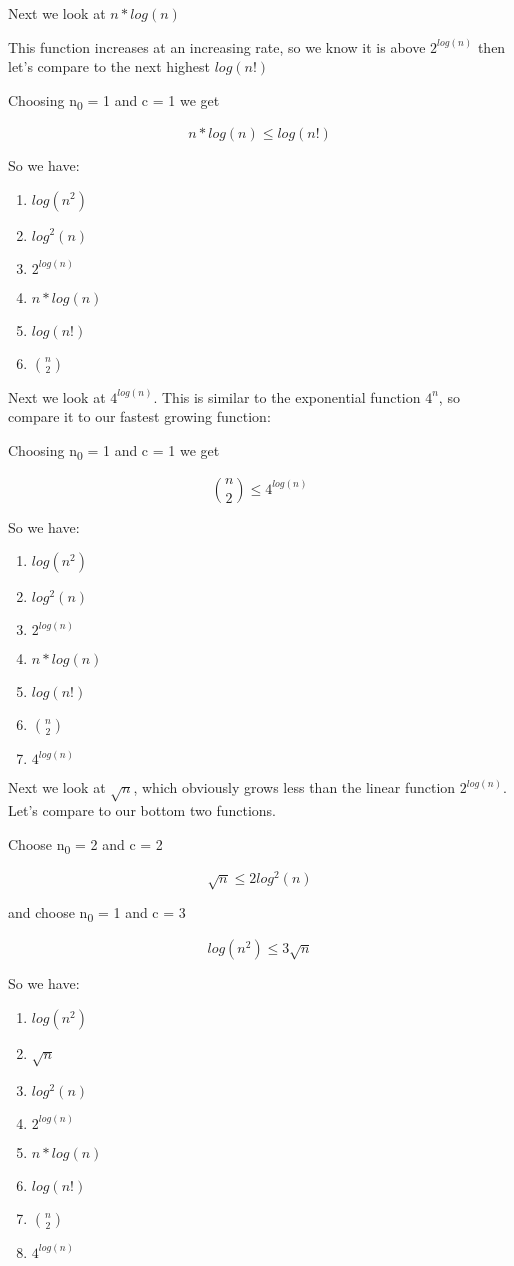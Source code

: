 \documentclass[]{article}
\providecommand{\tightlist}{%
  \setlength{\itemsep}{0pt}\setlength{\parskip}{0pt}}
\begin{document}
Next we look at \(n*log(n)\)

This function increases at an increasing rate, so we know it is above
\(2^{log(n)}\) then let's compare to the next highest \(log(n!)\)

Choosing n\textsubscript{0} = 1 and c = 1 we get

\[n*log(n) \leq log(n!)\]

So we have:

\begin{enumerate}
\def\labelenumi{\arabic{enumi}.}
\tightlist
\item
  \(log(n^2)\)
\item
  \(log^2(n)\)
\item
  \(2^{log(n)}\)
\item
  \(n*log(n)\)
\item
  \(log(n!)\)
\item
  \(n \choose 2\)
\end{enumerate}

Next we look at \(4^{log(n)}\). This is similar to the exponential
function \(4^n\), so compare it to our fastest growing function:

Choosing n\textsubscript{0} = 1 and c = 1 we get

\[\binom{n}{2} \leq 4^{log(n)}\]

So we have:

\begin{enumerate}
\def\labelenumi{\arabic{enumi}.}
\tightlist
\item
  \(log(n^2)\)
\item
  \(log^2(n)\)
\item
  \(2^{log(n)}\)
\item
  \(n*log(n)\)
\item
  \(log(n!)\)
\item
  \(n \choose 2\)
\item
  \(4^{log(n)}\)
\end{enumerate}

Next we look at \(\sqrt n\), which obviously grows less than the linear
function \(2^{log(n)}\). Let's compare to our bottom two functions.

Choose n\textsubscript{0} = 2 and c = 2

\[\sqrt n \leq 2log^2(n)\]

and choose n\textsubscript{0} = 1 and c = 3

\[log(n^2) \leq 3\sqrt n\]

So we have:

\begin{enumerate}
\def\labelenumi{\arabic{enumi}.}
\tightlist
\item
  \(log(n^2)\)
\item
  \(\sqrt n\)
\item
  \(log^2(n)\)
\item
  \(2^{log(n)}\)
\item
  \(n*log(n)\)
\item
  \(log(n!)\)
\item
  \(n \choose 2\)
\item
  \(4^{log(n)}\)
\end{enumerate}
\end{document}
